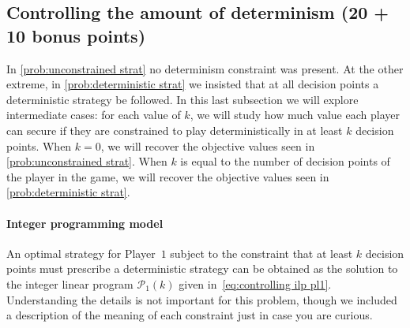 \documentclass{homework}
\begin{document}
\subsection{Controlling the amount of determinism (20 + 10 bonus points)}

In \cref{prob:unconstrained strat} no determinism constraint was present. At the other extreme, in \cref{prob:deterministic strat} we insisted that at all decision points a deterministic strategy be followed. In this last subsection we will explore intermediate cases: for each value of $k$, we will study how much value each player can secure if they are constrained to play deterministically in at least $k$ decision points. When $k=0$, we will recover the objective values seen in \cref{prob:unconstrained strat}. When $k$ is equal to the number of decision points of the player in the game, we will recover the objective values seen in \cref{prob:deterministic strat}.

\paragraph{Integer programming model} An optimal strategy for Player~$1$ subject to the constraint that at least $k$ decision points must prescribe a deterministic strategy can be obtained as the solution to the integer linear program $\mathcal{P}_1(k)$ given in~\eqref{eq:controlling ilp pl1}. Understanding the details is not important for this problem, though we included a description of the meaning of each constraint just in case you are curious. 
\end{document}
